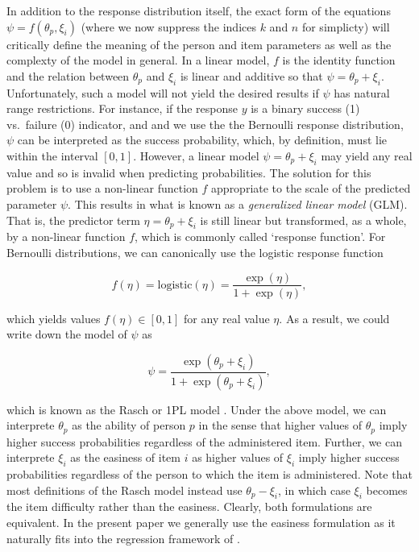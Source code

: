\documentclass[jss]{jss}
\begin{document}
In addition to the response distribution itself, the exact form of the
equations \(\psi = f(\theta_p, \xi_i)\) (where we now suppress the
indices \(k\) and \(n\) for simplicty) will critically define the
meaning of the person and item parameters as well as the complexty of
the model in general. In a linear model, \(f\) is the identity function
and the relation between \(\theta_p\) and \(\xi_i\) is linear and
additive so that \(\psi = \theta_p + \xi_i\). Unfortunately, such a
model will not yield the desired results if \(\psi\) has natural range
restrictions. For instance, if the response \(y\) is a binary success
(1) vs.~failure (0) indicator, and and we use the the Bernoulli response
distribution, \(\psi\) can be interpreted as the success probability,
which, by definition, must lie within the interval \([0, 1]\). However,
a linear model \(\psi = \theta_p + \xi_i\) may yield any real value and
so is invalid when predicting probabilities. The solution for this
problem is to use a non-linear function \(f\) appropriate to the scale
of the predicted parameter \(\psi\). This results in what is known as a
\emph{generalized linear model} (GLM). That is, the predictor term
\(\eta = \theta_p + \xi_i\) is still linear but transformed, as a whole,
by a non-linear function \(f\), which is commonly called `response
function'. For Bernoulli distributions, we can canonically use the
logistic response function

\[
f(\eta) = \text{logistic}(\eta) = \frac{\exp(\eta)}{1 + \exp(\eta)},
\]

which yields values \(f(\eta) \in [0, 1]\) for any real value \(\eta\).
As a result, we could write down the model of \(\psi\) as

\[
\psi = \frac{\exp(\theta_p + \xi_i)}{1 + \exp(\theta_p + \xi_i)},
\]

which is known as the Rasch or 1PL model \citep{bond2013}. Under the
above model, we can interprete \(\theta_p\) as the ability of person
\(p\) in the sense that higher values of \(\theta_p\) imply higher
success probabilities regardless of the administered item. Further, we
can interprete \(\xi_i\) as the easiness of item \(i\) as higher values
of \(\xi_i\) imply higher success probabilities regardless of the person
to which the item is administered. Note that most definitions of the
Rasch model instead use \(\theta_p - \xi_i\), in which case \(\xi_i\)
becomes the item difficulty rather than the easiness. Clearly, both
formulations are equivalent. In the present paper we generally use the
easiness formulation as it naturally fits into the regression framework
of .
\end{document}
